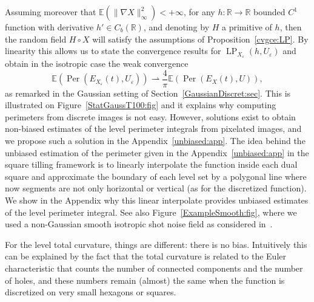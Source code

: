 \documentclass[AHL,Unicode,longabstracts,published]{cedram}
\newcommand{\R}{\mathbb{R}}
\newcommand{\E}{\mathbb{E}}
\newcommand{\eps}{\varepsilon}
\DeclareMathOperator{\LP}{LP}
\DeclareMathOperator{\Per}{Per}
\begin{document}
\pagebreak
\begin{rema}
Assuming moreover that $\E(\|\nabla X\|_\infty^2)<+\infty$, for any $h:\R\rightarrow
\R$ bounded $C^1$ function with derivative $h'\in C_b(\R)$, and denoting by $H$ a primitive of $h$, then the random field $H\circ X$ will satisfy the assumptions of Proposition~\ref{cvgce:LP}. By linearity this allows us to state the convergence results for $\LP_{X_\eps}(h,U_\eps)$ and obtain in the isotropic case the weak convergence
\[
\E\left(\Per(E_{X_\eps}(t),U_\eps)\right)\rightharpoonup \frac{4}{\pi} \E\left(\Per(E_{X}(t),U)\right),
\]
as remarked in the Gaussian setting of Section~\ref{GaussianDiscret:sec}. This is illustrated on Figure~\ref{StatGaussT100:fig} and it explains why computing perimeters from discrete images is not easy. However, solutions exist to obtain non-biased estimates of the level perimeter integrals from pixelated images, and we propose such a solution in the Appendix~\ref{unbiased:app}. The idea behind the unbiased estimation of the perimeter given in the Appendix~\ref{unbiased:app} in the square tilling framework is to linearly interpolate the function inside each dual square and approximate the boundary of each level set by a polygonal line where now segments are not only horizontal or vertical (as for the discretized function). We show in the Appendix why this linear interpolate provides unbiased estimates of the level perimeter integral. See also Figure~\ref{ExampleSmooth:fig}, where we used a non-Gaussian smooth isotropic shot noise field as considered in~\cite{BD-Geometry-published}.
\end{rema}



For the level total curvature, things are different: there is no bias. Intuitively this can be explained by the fact that the total curvature is related to the Euler characteristic that counts the number of connected components and the number of holes, and these numbers remain (almost) the same when the function is discretized on very small hexagons or squares.
\end{document}
